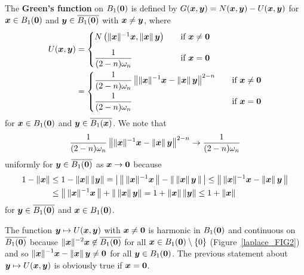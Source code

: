 The {\bfseries Green's function} on $B_1({\bm{0}})$ is
defined by $G({\bm{x}},{\bm{y}}) = N({\bm{x}},{\bm{y}}) - U({\bm{x}},{\bm{y}})$
for ${\bm{x}} \in B_1({\bm{0}})$ and ${\bm{y}} \in \overline{B_1({\bm{0}})}$ with
${\bm{x}} \neq {\bm{y}}$, where
\begin{align*}
U({\bm{x}},{\bm{y}}) &=
\begin{cases}
N\left(\|{\bm{x}}\|^{-1} {\bm{x}},\|{\bm{x}}\|\,{\bm{y}}\right) &
\quad \text{if} \ {\bm{x}} \neq {\bm{0}} \\[0.8em]
\displaystyle \frac{1}{(2-n)\omega_n} & \quad \text{if} \ {\bm{x}} = {\bm{0}}
\end{cases} \\
&= \begin{cases}
\displaystyle \frac{1}{(2-n)\omega_n}
\left\| \|{\bm{x}}\|^{-1}{\bm{x}} - \|{\bm{x}}\|\,{\bm{y}}\right\|^{2-n}
& \quad \text{if} \ {\bm{x}} \neq {\bm{0}} \\[0.8em]
\displaystyle \frac{1}{(2-n)\omega_n} & \quad \text{if} \ {\bm{x}} = {\bm{0}}
\end{cases}
\end{align*}
for ${\bm{x}} \in B_1({\bm{0}})$ and ${\bm{y}} \in \overline{B_1({\bm{x}})}$.
We note that
\[
\frac{1}{(2-n)\omega_n}
\left\| \|{\bm{x}}\|^{-1}{\bm{x}} -\|{\bm{x}}\|\,{\bm{y}}\right\|^{2-n}
\rightarrow  \frac{1}{(2-n)\omega_n}
\]
uniformly for ${\bm{y}} \in \overline{B_1({\bm{0}})}$ as
${\bm{x}}\rightarrow {\bm{0}}$ because
\begin{align*}
1-\|{\bm{x}}\| &\leq 1 - \|{\bm{x}}\|\,\|{\bm{y}}\| =
\left|\, \left\|\, \|{\bm{x}}\|^{-1}{\bm{x}} \, \right\| -
\left\|\, \|{\bm{x}}\|\,{\bm{y}} \, \right\|\, \right|
\leq \left\|\, \|{\bm{x}}\|^{-1}{\bm{x}} -\|{\bm{x}}\|\,{\bm{y}} \,\right\| \\
&\leq \left\|\, \|{\bm{x}}\|^{-1}{\bm{x}} \,\right\|
+\left\|\, \|{\bm{x}}\|\,{\bm{y}} \right\| = 1 + \|{\bm{x}}\|\,\|{\bm{y}}\|
\leq 1 + \|{\bm{x}}\|
\end{align*}
for ${\bm{y}}\in \overline{B_1({\bm{0}})}$ and
${\bm{x}}\in B_1({\bm{0}})$.

The function ${\bm{y}} \mapsto U({\bm{x}},{\bm{y}})$ with
${\bm{x}} \neq {\bm{0}}$ is harmonic in $B_1({\bm{0}})$ and continuous on
$\overline{B_1({\bm{0}})}$ because
$\displaystyle \|{\bm{x}}\|^{-2}{\bm{x}} \not\in \overline{B_1({\bm{0}})}$ for all
${\bm{x}} \in B_1({\bm{0}}) \setminus \{0\}$ (Figure~\ref{laplace_FIG2})
and so
$\displaystyle \|{\bm{x}}\|^{-1}{\bm{x}} -\|{\bm{x}}\|\,{\bm{y}} \neq {\bm{0}}$
for all ${\bm{y}} \in B_1({\bm{0}})$.  The previous statement about
${\bm{y}} \mapsto U({\bm{x}},{\bm{y}})$ is obviously true
if ${\bm{x}} = {\bm{0}}$.

